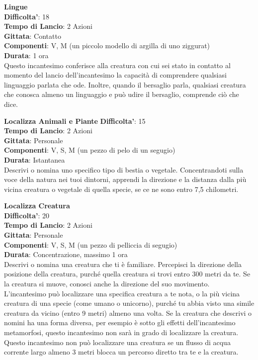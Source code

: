 \begin{multicols}{2}
\medskip\textbf{Lingue}\\
\textbf{Difficolta'}: 18\\
\textbf{Tempo di Lancio}: 2 Azioni\\
\textbf{Gittata}: Contatto\\
\textbf{Componenti}: V, M (un piccolo modello di argilla di uno ziggurat)\\
\textbf{Durata}: 1 ora\\
Questo incantesimo conferisce alla creatura con cui sei stato in contatto al momento del lancio dell’incantesimo la capacità di comprendere qualsiasi linguaggio parlata che ode. Inoltre, quando il bersaglio parla, qualsiasi creatura che conosca almeno un linguaggio e può udire il bersaglio, comprende ciò che dice.

\medskip\textbf{Localizza Animali e Piante}
\textbf{Difficolta'}: 15\\
\textbf{Tempo di Lancio}: 2 Azioni\\
\textbf{Gittata}: Personale\\
\textbf{Componenti}: V, S, M (un pezzo di pelo di un segugio) \\
\textbf{Durata}: Istantanea\\
Descrivi o nomina uno specifico tipo di bestia o vegetale. Concentrandoti sulla voce della natura nei tuoi dintorni, apprendi la direzione e la distanza dalla più vicina creatura o vegetale di quella specie, se ce ne sono entro 7,5 chilometri.

\medskip\textbf{Localizza Creatura}\\
\textbf{Difficolta'}: 20\\
\textbf{Tempo di Lancio}: 2 Azioni\\
\textbf{Gittata}: Personale\\
\textbf{Componenti}: V, S, M (un pezzo di pelliccia di segugio)\\
\textbf{Durata}: Concentrazione, massimo 1 ora\\
Descrivi o nomina una creatura che ti è familiare. Percepisci la direzione della posizione della creatura, purché quella creatura si trovi entro 300 metri da te. Se la creatura si muove, conosci anche la direzione del suo movimento.\\
L’incantesimo può localizzare una specifica creatura a te nota, o la più vicina creatura di una specie (come umano o unicorno), purché tu abbia visto una simile creatura da vicino (entro 9 metri) almeno una volta. Se la creatura che descrivi o nomini ha una forma diversa, per esempio è sotto gli effetti dell’incantesimo metamorfosi, questo incantesimo non sarà in grado di localizzare la creatura.\\
Questo incantesimo non può localizzare una creatura se un flusso di acqua corrente largo almeno 3 metri blocca un percorso diretto tra te e la creatura.


\end{multicols}
